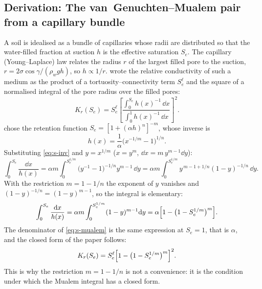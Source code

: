 \subsection{Derivation: The van~Genuchten--Mualem pair from a capillary bundle}\label{der:s4:1}
A soil is idealised as a bundle of capillaries whose radii are distributed so that the water-filled fraction at suction $h$ is the effective saturation $S_e$. The capillary (Young--Laplace) law relates the radius $r$ of the largest filled pore to the suction, $r=2\sigma\cos\gamma/(\rho_w g h)$, so $h\propto1/r$. \citet{Mualem1976} wrote the relative conductivity of such a medium as the product of a tortuosity--connectivity term $S_e^{\ell}$ and the square of a normalised integral of the pore radius over the filled pores:
\begin{equation}
K_r(S_e)=S_e^{\ell}\left[\frac{\int_0^{S_e}h(x)^{-1}\,\dd x}{\int_0^{1}h(x)^{-1}\,\dd x}\right]^{2}. \label{eq:s-mualem}
\end{equation}
\citet{vanGenuchten1980} chose the retention function $S_e=[1+(\alpha h)^n]^{-m}$, whose inverse is
\begin{equation}
h(x)=\frac{1}{\alpha}\bigl(x^{-1/m}-1\bigr)^{1/n}. \label{eq:s-inv}
\end{equation}
Substituting \cref{eq:s-inv} and $y=x^{1/m}$ ($x=y^{m}$, $\dd x=m\,y^{m-1}\dd y$):
\begin{equation}
\int_0^{S_e}\frac{\dd x}{h(x)}=\alpha m\int_0^{S_e^{1/m}}\bigl(y^{-1}-1\bigr)^{-1/n}y^{m-1}\,\dd y=\alpha m\int_0^{S_e^{1/m}}y^{\,m-1+1/n}(1-y)^{-1/n}\,\dd y .
\end{equation}
With the restriction $m=1-1/n$ the exponent of $y$ vanishes and $(1-y)^{-1/n}=(1-y)^{m-1}$, so the integral is elementary:
\begin{equation}
\int_0^{S_e}\frac{\mathrm{d} x}{h(x)}=\alpha m\int_0^{S_e^{1/m}}(1-y)^{m-1}\mathrm{d} y=\alpha\Bigl[1-\bigl(1-S_e^{1/m}\bigr)^{m}\Bigr].
\end{equation}
The denominator of \cref{eq:s-mualem} is the same expression at $S_e=1$, that is $\alpha$, and the closed form of the paper follows:
\begin{equation}
K_r(S_e)=S_e^{\ell}\Bigl[1-\bigl(1-S_e^{1/m}\bigr)^{m}\Bigr]^{2}. \label{eq:s-kr}
\end{equation}
This is why the restriction $m=1-1/n$ is not a convenience: it is the condition under which the Mualem integral has a closed form.


